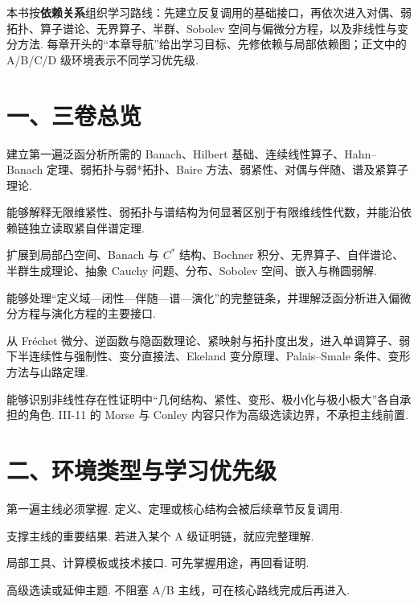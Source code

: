 \cleardoublepage
{}
{}

本书按\textbf{依赖关系}组织学习路线：先建立反复调用的基础接口，再依次进入对偶、弱拓扑、算子谱论、无界算子、半群、Sobolev 空间与偏微分方程，以及非线性与变分方法. 每章开头的“本章导航”给出学习目标、先修依赖与局部依赖图；正文中的 A/B/C/D 级环境表示不同学习优先级.

\section*{一、三卷总览}
建立第一遍泛函分析所需的 Banach、Hilbert 基础、连续线性算子、Hahn--Banach 定理、弱拓扑与弱*拓扑、Baire 方法、弱紧性、对偶与伴随、谱及紧算子理论.\par\smallskip
{}能够解释无限维紧性、弱拓扑与谱结构为何显著区别于有限维线性代数，并能沿依赖链独立读取紧自伴谱定理.

扩展到局部凸空间、Banach 与 \(\displaystyle C^*\) 结构、Bochner 积分、无界算子、自伴谱论、半群生成理论、抽象 Cauchy 问题、分布、Sobolev 空间、嵌入与椭圆弱解.\par\smallskip
{}能够处理“定义域—闭性—伴随—谱—演化”的完整链条，并理解泛函分析进入偏微分方程与演化方程的主要接口.

从 Fréchet 微分、逆函数与隐函数理论、紧映射与拓扑度出发，进入单调算子、弱下半连续性与强制性、变分直接法、Ekeland 变分原理、Palais--Smale 条件、变形方法与山路定理.\par\smallskip
{}能够识别非线性存在性证明中“几何结构、紧性、变形、极小化与极小极大”各自承担的角色. III-11 的 Morse 与 Conley 内容只作为高级选读边界，不承担主线前置.

\section*{二、环境类型与学习优先级}
\begin{tcolorbox}[fa/A,title={A级·主线核心}]第一遍主线必须掌握. 定义、定理或核心结构会被后续章节反复调用.\end{tcolorbox}
\begin{tcolorbox}[fa/B,title={B级·重要支撑}]支撑主线的重要结果. 若进入某个 A 级证明链，就应完整理解.\end{tcolorbox}
\begin{tcolorbox}[fa/C,title={C级·局部工具}]局部工具、计算模板或技术接口. 可先掌握用途，再回看证明.\end{tcolorbox}
\begin{tcolorbox}[fa/D,title={D级·高级选读}]高级选读或延伸主题. 不阻塞 A/B 主线，可在核心路线完成后再进入.\end{tcolorbox}

